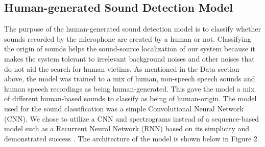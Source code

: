 \documentclass{article}
\begin{document}
\subsection{Human-generated Sound Detection Model}
The purpose of the human-generated sound detection model is to classify whether sounds recorded by the microphone are created by a human or not. Classifying the origin of sounds helps the sound-source localization of our system because it makes the system tolerant to irrelevant background noises and other noises that do not aid the search for human victims. As mentioned in the Data section above, the model was trained to a mix of human, non-speech speech sounds and human speech recordings as being human-generated. This gave the model a mix of different human-based sounds to classify as being of human-origin.
The model used for the sound classification was a simple Convolutional Neural Network (CNN). We chose to utilize a CNN and spectrograms instead of a sequence-based model such as a Recurrent Neural Network (RNN) based on its simplicity and demonstrated success \cite{7,8}. The architecture of the model is shown below in Figure 2.
\end{document}

